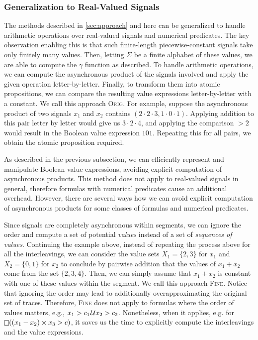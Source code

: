 \newpage

\subsubsection{Generalization to Real-Valued Signals}
The methods described in \cref{sec:approach} and here can be generalized to handle arithmetic operations over real-valued signals and numerical predicates.
The key observation enabling this is that such finite-length piecewise-constant signals take only finitely many values.
Then, letting $\Sigma$ be a finite alphabet of these values, we are able to compute the $\gamma$ function as described.
To handle arithmetic operations, we can compute the asynchronous product of the signals involved and apply the given operation letter-by-letter.
Finally, to transform them into atomic propositions, we can compare the resulting value expressions letter-by-letter with a constant.
We call this approach \textsc{Orig}.
For example, suppose the asynchronous product of two signals $x_1$ and $x_2$ contains $(2\cdot2\cdot3, 1\cdot0\cdot1)$.
Applying addition to this pair letter by letter would give us $3 \cdot 2 \cdot 4$, and applying the comparison $> 2$ would result in the Boolean value expression $101$.
Repeating this for all pairs, we obtain the atomic proposition required.

As described in the previous subsection, we can efficiently represent and manipulate Boolean value expressions, avoiding explicit computation of asynchronous products.
This method does not apply to real-valued signals in general, therefore formulas with numerical predicates cause an additional overhead.
However, there are several ways how we can avoid explicit computation of asynchronous products for some classes of formulas and numerical predicates.

Since signals are completely asynchronous within segments, we can ignore the order and compute a set of potential \emph{values} instead of a set of \emph{sequences of values}.
Continuing the example above, instead of repeating the process above for all the interleavings, we can consider the value sets $X_1 = \{2,3\}$ for $x_1$ and $X_2 = \{0,1\}$ for $x_2$ to conclude by pairwise addition that the values of $x_1 + x_2$ come from the set $\{2, 3, 4\}$.
Then, we can simply assume that $x_1 + x_2$ is constant with one of these values within the segment.  
We call this approach \textsc{Fine}.
Notice that ignoring the order may lead to additionally overapproximating the original set of traces.
Therefore, \textsc{Fine} does not apply to formulas where the order of values matters, e.g.,  $x_1 > c_1 \kern.1em\mathcal{U} x_2 > c_2$.
Nonetheless, when it applies, e.g. for $\LTLalways((x_1 - x_2) \times x_3 > c)$, it saves us the time to explicitly compute the interleavings and the value expressions.

